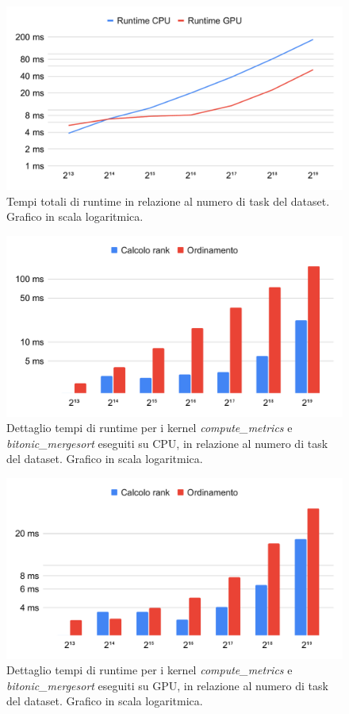 \begin{center}
\begin{figure}
\includegraphics[width=\textwidth]{Images/runtime_total.pdf}
\caption{Tempi totali di runtime in relazione al numero di task del dataset. Grafico in scala logaritmica.}
\label{runtimetotal}
\end{figure}
\begin{figure}
\includegraphics[width=\textwidth]{Images/kernel_cpu.pdf}
\caption{Dettaglio tempi di runtime per i kernel \textit{compute\_metrics} e \textit{bitonic\_mergesort} eseguiti su CPU, in relazione al numero di task del dataset. Grafico in scala logaritmica.}
\label{runtimegpu}
\end{figure}
\begin{figure}
\includegraphics[width=\textwidth]{Images/kernel_gpu.pdf}
\caption{Dettaglio tempi di runtime per i kernel \textit{compute\_metrics} e \textit{bitonic\_mergesort} eseguiti su GPU, in relazione al numero di task del dataset. Grafico in scala logaritmica.}
\label{runtimecpu}
\end{figure}
\end{center}
